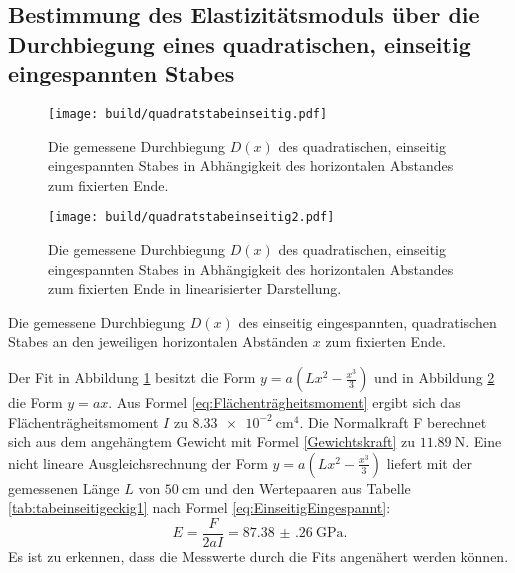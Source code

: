 \subsection{Bestimmung des Elastizitätsmoduls über die Durchbiegung eines quadratischen, einseitig eingespannten Stabes}

\begin{figure}
	\centering
	\caption{Die gemessene Durchbiegung $D(x)$ des quadratischen, einseitig eingespannten Stabes
	 in Abhängigkeit des horizontalen Abstandes zum fixierten Ende.}
	\texttt{[image: build/quadratstabeinseitig.pdf]}
	\label{fig:quadratisch}
\end{figure}
\begin{figure}
	\centering
	\caption{Die gemessene Durchbiegung $D(x)$ des quadratischen, einseitig eingespannten Stabes
	 in Abhängigkeit des horizontalen Abstandes zum fixierten Ende in linearisierter Darstellung.}
	\texttt{[image: build/quadratstabeinseitig2.pdf]}
	\label{fig:quadratischlinear}
\end{figure}
\begin{table}
	\caption{Die gemessene Durchbiegung $D(x)$ des einseitig eingespannten, quadratischen Stabes an den jeweiligen horizontalen Abständen $x$ zum fixierten Ende.}
	\begin{minipage}{0.5\textwidth}
		\centering
		
	\end{minipage}
	\begin{minipage}{0.5\textwidth}
		\centering
		
	\end{minipage}
\end{table}
Der Fit in Abbildung \ref{fig:quadratisch} besitzt die Form $y = a ( L x^2 - \frac{x^3}{3} ) $ und in Abbildung \ref{fig:quadratischlinear} die Form $y=a x$. Aus Formel \eqref{eq:Flächenträgheitsmoment} ergibt sich das Flächenträgheitsmoment $I$ zu $\SI{8.33e-2}{\centi\meter\tothe{4}}$. Die Normalkraft F berechnet sich aus dem angehängtem Gewicht mit Formel \eqref{Gewichtskraft} zu $\SI{11.89}{\newton}$. Eine nicht lineare Ausgleichsrechnung der Form $y = a ( L x^2 - \frac{x^3}{3})$ liefert mit der gemessenen Länge $L$ von $\SI{50}{\centi\meter}$ und den Wertepaaren aus Tabelle \ref{tab:tabeinseitigeckig1} nach Formel \eqref{eq:EinseitigEingespannt}:
\begin{displaymath}
E = \frac{F}{2 a I}= \SI{87.38(26)}{\giga\pascal}\text{.}
\end{displaymath}
Es ist zu erkennen, dass die Messwerte durch die Fits angenähert werden können.



